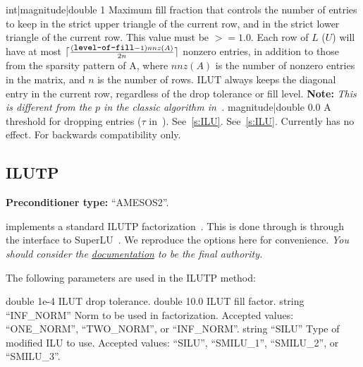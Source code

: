     {int|magnitude|double}
    {1}
    {Maximum fill fraction that controls the
     number of entries to keep in the strict upper triangle of the
     current row, and in the strict lower triangle of the current
     row.  This value must be $>= 1.0$.  Each row of $L$ ($U$) will have at most $\lceil\frac{(\mbox{\small\tt
     level-of-fill}-1)nnz(A)}{2n}\rceil$ nonzero entries, in addition to those from the sparsity pattern of A, where $nnz(A)$ is the
     number of nonzero entries in the matrix, and $n$ is the number of rows.
     ILUT always keeps the diagonal entry in the current row, regardless of the
     drop tolerance or fill level. \textbf{Note:} \textit{This is
     different from the $p$ in the classic algorithm in~\cite{Saad1994}.}}
    {magnitude|double}
    {0.0}
    {A threshold for dropping entries ($\tau$ in~\cite{Saad1994}).}
    {See~\ref{s:ILU}.}
    {See~\ref{s:ILU}.}
    {Currently has no effect. For backwards compatibility only.}

\subsection{ILUTP}\label{s:ILUTP}

\textbf{Preconditioner type:} ``AMESOS2''.


\ifpacktwo{} implements a standard ILUTP factorization~\cite{Saad2003}. This is
done through is through the \amesostwo interface to SuperLU~\cite{Li2011}. We
reproduce the \amesostwo options here for convenience. {\em You should consider
the \href{http://trilinos.org/docs/dev/packages/amesos2/doc/html/group__amesos2__solver__parameters.html#superlu_parameters}{\amesostwo
documentation} to be the final authority.}

The following parameters are used in the ILUTP method:

    {double}
    {1e-4}
    {ILUT drop tolerance.}
    {double}
    {10.0}
    {ILUT fill factor.}
    {string}
    {``INF\_NORM''}
    {Norm to be used in factorization. Accepted values: ``ONE\_NORM'', ``TWO\_NORM'', or ``INF\_NORM''.}
    {string}
    {``SILU''}
    {Type of modified ILU to use. Accepted values: ``SILU'', ``SMILU\_1'', ``SMILU\_2'', or ``SMILU\_3''.}

